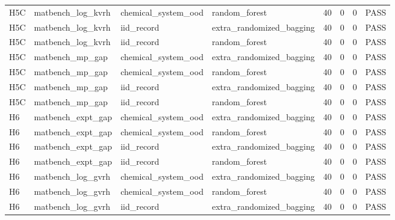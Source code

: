 \documentclass[10pt]{article}
\begin{document}
\begin{landscape}
\begin{longtable}{L{.32in}L{1.05in}L{1.2in}L{1.3in}L{.42in}L{.42in}L{.42in}L{.48in}}
H5C & matbench\_\allowbreak{}log\_\allowbreak{}kvrh & chemical\_\allowbreak{}system\_\allowbreak{}ood & random\_\allowbreak{}forest & 40 & 0 & 0 & PASS\\
H5C & matbench\_\allowbreak{}log\_\allowbreak{}kvrh & iid\_\allowbreak{}record & extra\_\allowbreak{}randomized\_\allowbreak{}bagging & 40 & 0 & 0 & PASS\\
H5C & matbench\_\allowbreak{}log\_\allowbreak{}kvrh & iid\_\allowbreak{}record & random\_\allowbreak{}forest & 40 & 0 & 0 & PASS\\
H5C & matbench\_\allowbreak{}mp\_\allowbreak{}gap & chemical\_\allowbreak{}system\_\allowbreak{}ood & extra\_\allowbreak{}randomized\_\allowbreak{}bagging & 40 & 0 & 0 & PASS\\
H5C & matbench\_\allowbreak{}mp\_\allowbreak{}gap & chemical\_\allowbreak{}system\_\allowbreak{}ood & random\_\allowbreak{}forest & 40 & 0 & 0 & PASS\\
H5C & matbench\_\allowbreak{}mp\_\allowbreak{}gap & iid\_\allowbreak{}record & extra\_\allowbreak{}randomized\_\allowbreak{}bagging & 40 & 0 & 0 & PASS\\
H5C & matbench\_\allowbreak{}mp\_\allowbreak{}gap & iid\_\allowbreak{}record & random\_\allowbreak{}forest & 40 & 0 & 0 & PASS\\
H6 & matbench\_\allowbreak{}expt\_\allowbreak{}gap & chemical\_\allowbreak{}system\_\allowbreak{}ood & extra\_\allowbreak{}randomized\_\allowbreak{}bagging & 40 & 0 & 0 & PASS\\
H6 & matbench\_\allowbreak{}expt\_\allowbreak{}gap & chemical\_\allowbreak{}system\_\allowbreak{}ood & random\_\allowbreak{}forest & 40 & 0 & 0 & PASS\\
H6 & matbench\_\allowbreak{}expt\_\allowbreak{}gap & iid\_\allowbreak{}record & extra\_\allowbreak{}randomized\_\allowbreak{}bagging & 40 & 0 & 0 & PASS\\
H6 & matbench\_\allowbreak{}expt\_\allowbreak{}gap & iid\_\allowbreak{}record & random\_\allowbreak{}forest & 40 & 0 & 0 & PASS\\
H6 & matbench\_\allowbreak{}log\_\allowbreak{}gvrh & chemical\_\allowbreak{}system\_\allowbreak{}ood & extra\_\allowbreak{}randomized\_\allowbreak{}bagging & 40 & 0 & 0 & PASS\\
H6 & matbench\_\allowbreak{}log\_\allowbreak{}gvrh & chemical\_\allowbreak{}system\_\allowbreak{}ood & random\_\allowbreak{}forest & 40 & 0 & 0 & PASS\\
H6 & matbench\_\allowbreak{}log\_\allowbreak{}gvrh & iid\_\allowbreak{}record & extra\_\allowbreak{}randomized\_\allowbreak{}bagging & 40 & 0 & 0 & PASS\\

\end{longtable}
\end{landscape}
\end{document}
